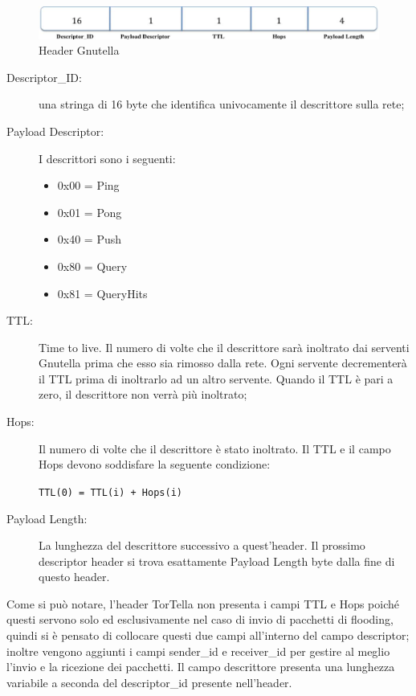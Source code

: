 \begin{figure}[H]
\begin{center}
\includegraphics[scale=0.38]{etc/gnutellaheader.jpg}
\caption{Header Gnutella}
\label{gnutellaheader}
\end{center}
\end{figure}
\begin{description}
\item[Descriptor\_ID:] una stringa di 16 byte che identifica univocamente il descrittore sulla rete;
\item[Payload Descriptor:] I descrittori sono i seguenti:
\begin{itemize}
	\item 0x00 = Ping
	\item 0x01 = Pong
	\item 0x40 = Push
	\item 0x80 = Query
	\item 0x81 = QueryHits	
\end{itemize}
\item[TTL:] Time to live. Il numero di volte che il descrittore sarà inoltrato dai serventi Gnutella prima che esso sia rimosso dalla rete. Ogni servente decrementerà il TTL prima di inoltrarlo ad un altro servente. Quando il TTL è pari a zero, il descrittore non verrà più inoltrato;
\item[Hops:] Il numero di volte che il descrittore è stato inoltrato. Il TTL e il campo Hops devono soddisfare la seguente condizione: 
\begin{center}
\texttt{TTL(0) = TTL(i)  + Hops(i)}
\end{center}
\item[Payload Length:] La lunghezza del descrittore successivo a quest’header. Il prossimo descriptor header si trova esattamente Payload Length byte dalla fine di questo header.
\end{description}
Come si può notare, l’header TorTella non presenta i campi TTL e Hops poiché questi servono solo ed esclusivamente nel caso di invio di pacchetti di flooding, quindi si è pensato di collocare questi due campi all’interno del campo descriptor; inoltre vengono aggiunti i campi sender\_id e receiver\_id per gestire al meglio l’invio e la ricezione dei pacchetti. Il campo descrittore presenta una lunghezza variabile a seconda del descriptor\_id presente nell’header.
